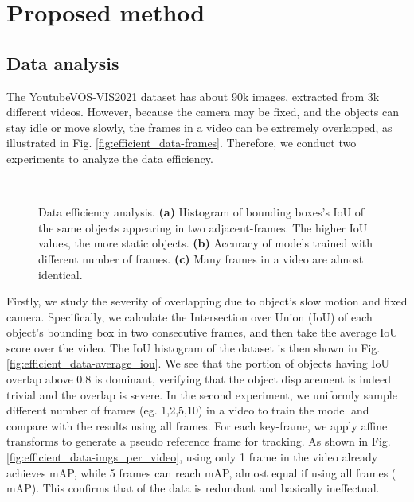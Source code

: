 \documentclass[10pt,twocolumn,letterpaper]{article}
\begin{document}
\section{Proposed method}
\label{sec:proposed-method}
\subsection{Data analysis} The YoutubeVOS-VIS2021 dataset has about 90k images, extracted from 3k different videos. However, because the camera may be fixed, and the objects can stay idle or move slowly, the frames in a video can be extremely overlapped, as illustrated in Fig. \ref{fig:efficient_data-frames}. Therefore, we conduct two experiments to analyze the data efficiency. 

\begin{figure}
	\centering
	\\
	\caption{\small Data efficiency analysis. \textbf{(a)} Histogram of bounding boxes's IoU of the same objects appearing in two adjacent-frames. The higher IoU values, the more static objects. \textbf{(b)} Accuracy of models trained with different number of frames. \textbf{(c)} Many frames in a video are almost identical.}
	\label{fig:efficient_data}
\end{figure}

Firstly, we study the severity of overlapping due to object's slow motion and fixed camera. Specifically, we calculate the Intersection over Union (IoU) of each object's bounding box in two consecutive frames, and then take the average IoU score over the video. The IoU histogram of the dataset is then shown in Fig. \ref{fig:efficient_data-average_iou}. We see that the portion of objects having IoU overlap above 0.8 is dominant, verifying that the object displacement is indeed trivial and the overlap is severe. In the second experiment, we uniformly sample different number of frames (eg. 1,2,5,10) in a video to train the model and compare with the results using all frames. For each key-frame, we apply affine transforms to generate a pseudo reference frame for tracking. As shown in Fig. \ref{fig:efficient_data-imgs_per_video}, using only 1 frame in the video already achieves  mAP, while 5 frames can reach  mAP, almost equal if using all frames ( mAP). This confirms that  of the data is redundant and basically ineffectual.
\end{document}
